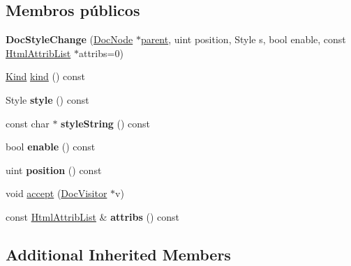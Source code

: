 \subsection*{Membros públicos}
\begin{DoxyCompactItemize}
\item 
\hypertarget{class_doc_style_change_ac18d7c97d0c1bbb1c1217b3a3d053a03}{{\bfseries Doc\-Style\-Change} (\hyperlink{class_doc_node}{Doc\-Node} $\ast$\hyperlink{class_doc_node_abd7f070d6b0a38b4da71c2806578d19d}{parent}, uint position, Style s, bool enable, const \hyperlink{class_html_attrib_list}{Html\-Attrib\-List} $\ast$attribs=0)}\label{class_doc_style_change_ac18d7c97d0c1bbb1c1217b3a3d053a03}

\item 
\hyperlink{class_doc_node_aa10c9e8951b8ccf714a59ec321bdac5b}{Kind} \hyperlink{class_doc_style_change_aa9d037bed9f9a083d0cd01485637d843}{kind} () const 
\item 
\hypertarget{class_doc_style_change_aeab0714e3be7962800a3410bbbc0494b}{Style {\bfseries style} () const }\label{class_doc_style_change_aeab0714e3be7962800a3410bbbc0494b}

\item 
\hypertarget{class_doc_style_change_af8f5db16dd2aad770a82c6630d44b014}{const char $\ast$ {\bfseries style\-String} () const }\label{class_doc_style_change_af8f5db16dd2aad770a82c6630d44b014}

\item 
\hypertarget{class_doc_style_change_a95a85353493246b0fd221ecfe92b1693}{bool {\bfseries enable} () const }\label{class_doc_style_change_a95a85353493246b0fd221ecfe92b1693}

\item 
\hypertarget{class_doc_style_change_a7aaa3b8207a9f91310dbc6392a64cbce}{uint {\bfseries position} () const }\label{class_doc_style_change_a7aaa3b8207a9f91310dbc6392a64cbce}

\item 
void \hyperlink{class_doc_style_change_a7ba716e854ae2f8f87a4eb2140e302b6}{accept} (\hyperlink{class_doc_visitor}{Doc\-Visitor} $\ast$v)
\item 
\hypertarget{class_doc_style_change_aae3c838ea3d3273b35d07e9965a8985e}{const \hyperlink{class_html_attrib_list}{Html\-Attrib\-List} \& {\bfseries attribs} () const }\label{class_doc_style_change_aae3c838ea3d3273b35d07e9965a8985e}

\end{DoxyCompactItemize}
\subsection*{Additional Inherited Members}


